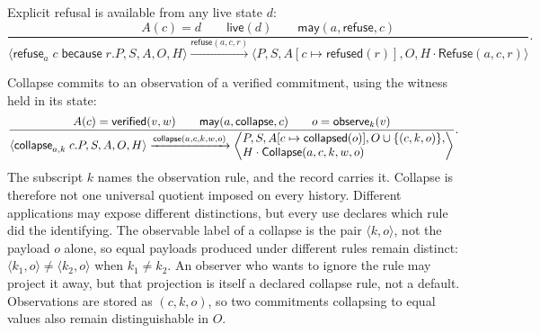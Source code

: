 \documentclass[11pt,openany]{book}
\theoremstyle{remark}
\newcommand{\Refuse}{\mathsf{Refuse}}
\newcommand{\Collapse}{\mathsf{Collapse}}
\begin{document}
Explicit refusal is available from any live state $d$:
\[
\frac{A(c)=d\qquad\mathsf{live}(d)\qquad
      \mathsf{may}(a,\mathsf{refuse},c)}{
\langle \mathsf{refuse}_a\;c\;\mathsf{because}\;r.P,S,A,O,H\rangle
\xrightarrow{\mathsf{refuse}(a,c,r)}
\langle P,S,A[c\mapsto\mathsf{refused}(r)],O,
H\cdot\Refuse(a,c,r)\rangle}.
\]

Collapse commits to an observation of a verified commitment, using the
witness held in its state:
{\footnotesize
\[
\frac{A(c)=\mathsf{verified}(v,w)\qquad
      \mathsf{may}(a,\mathsf{collapse},c)\qquad
      o=\mathsf{observe}_k(v)}{
\langle \mathsf{collapse}_{a,k}\;c.P,S,A,O,H\rangle
\xrightarrow{\mathsf{collapse}(a,c,k,w,o)}
\left\langle\begin{array}{@{}l@{}}P,S,A[c\mapsto\mathsf{collapsed}(o)],
O\cup\{(c,k,o)\},\\ H\cdot\Collapse(a,c,k,w,o)\end{array}\right\rangle}.
\]
}
The subscript $k$ names the observation rule, and the record carries it.
Collapse is therefore not one universal quotient imposed on every history.
Different applications may expose different distinctions, but every use
declares which rule did the identifying. The observable label of a
collapse is the pair $\langle k,o\rangle$, not the payload $o$ alone, so
equal payloads produced under different rules remain distinct:
$\langle k_1,o\rangle\neq\langle k_2,o\rangle$ when $k_1\neq k_2$. An
observer who wants to ignore the rule may project it away, but that
projection is itself a declared collapse rule, not a default. Observations
are stored as $(c,k,o)$, so two commitments collapsing to equal values also
remain distinguishable in $O$.
\end{document}
